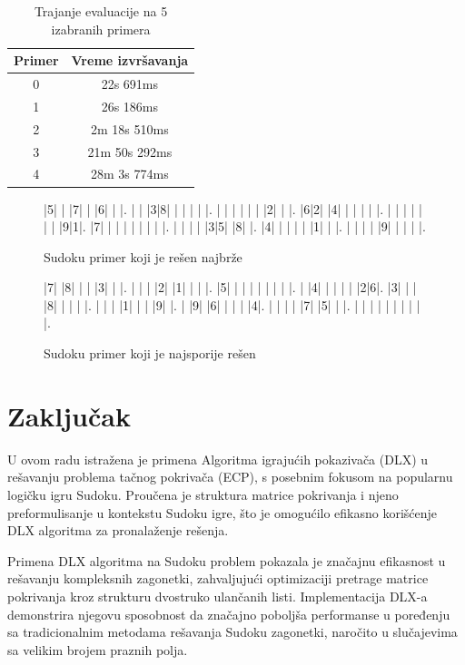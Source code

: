 \documentclass[a4paper]{article}
\begin{document}
{\begin{table}[h!]
\centering
\begin{tabular}{|c|c|}
  \hline
  Primer & Vreme izvršavanja\\ \hline
  0 & 22s 691ms \\ \hline
  1 & 26s 186ms \\ \hline
  2 & 2m 18s 510ms \\ \hline
  3 & 21m 50s 292ms \\ \hline
  4 & 28m 3s 774ms \\ \hline
  \end{tabular}
  \caption{Trajanje evaluacije na 5 izabranih primera}
\label{tab:result}
\end{table}

\begin{figure}[h!]
\begin{sudoku}
|5| | |7| | |6| | |.
| | |3|8| | | | | |.
| | | | | | |2| | |.
|6|2| |4| | | | | |.
| | | | | | | |9|1|.
|7| | | | | | | | |.
| | | | |3|5| |8| |.
|4| | | | | |1| | |.
| | | | |9| | | | |.
\end{sudoku}
\caption{Sudoku primer koji je rešen najbrže}
\label{fig:sudoku_easy}
\end{figure}

\begin{figure}[h!]
\begin{sudoku}
|7| |8| | | |3| | |.
| | | |2| |1| | | |.
|5| | | | | | | | |.
| |4| | | | | |2|6|.
|3| | | |8| | | | |.
| | | |1| | | |9| |.
| |9| |6| | | | |4|.
| | | | |7| |5| | |.
| | | | | | | | | |.
\end{sudoku}
\caption{Sudoku primer koji je najsporije rešen}
\label{fig:sudoku_hard}
\end{figure}
    


\section{Zaključak}
\label{sec:zakljucak}

U ovom radu istražena je primena Algoritma igrajućih pokazivača (DLX) u rešavanju problema tačnog pokrivača (ECP), s posebnim fokusom
na popularnu logičku igru Sudoku. Proučena je struktura matrice pokrivanja i njeno preformulisanje u kontekstu Sudoku igre, što je
omogućilo efikasno korišćenje DLX algoritma za pronalaženje rešenja.

Primena DLX algoritma na Sudoku problem pokazala je značajnu efikasnost u rešavanju kompleksnih zagonetki, zahvaljujući optimizaciji
pretrage matrice pokrivanja kroz strukturu dvostruko ulančanih listi. Implementacija DLX-a demonstrira njegovu sposobnost da značajno
poboljša performanse u poređenju sa tradicionalnim metodama rešavanja Sudoku zagonetki, naročito u slučajevima sa velikim brojem praznih
polja.

}
\end{document}
